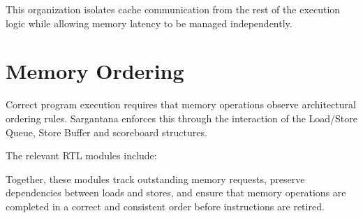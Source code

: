 This organization isolates cache communication from the rest of the execution logic while
allowing memory latency to be managed independently.

\section{Memory Ordering}

Correct program execution requires that memory operations observe architectural ordering
rules. Sargantana enforces this through the interaction of the Load/Store Queue, Store Buffer
and scoreboard structures.

The relevant RTL modules include:

\begin{rtlrefs}
\end{rtlrefs}

Together, these modules track outstanding memory requests, preserve dependencies between
loads and stores, and ensure that memory operations are completed in a correct and consistent
order before instructions are retired.
